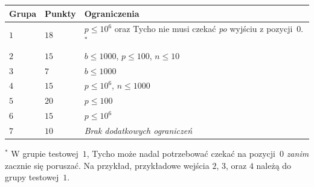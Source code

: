 \medskip
\begin{tabular}{lll}
Grupa & Punkty & Ograniczenia \\\hline
  $1$ & $18$  & $p\leq 10^6$ oraz Tycho nie musi czekać \emph{po} wyjściu z pozycji~$0$.$^*$ \\ %
  $2$ & $15$  & $b\leq 1000$, $p\leq 100$, $n\leq 10$ \\
  $3$ & $7$  & $b\leq 1000$ \\
  $4$ & $15$ & $p\leq 10^6$, $n\leq 1000$\\
  $5$ & $20$ & $p\leq 100$\\
  $6$ & $15$ & $p\leq 10^6$\\
  $7$ & $10$ & \emph{Brak dodatkowych ograniczeń}
\end{tabular}

\medskip
\noindent $^*$ W grupie testowej~$1$, Tycho może nadal potrzebować czekać na pozycji~$0$ \emph{zanim} zacznie się poruszać.
Na przykład, przykładowe wejścia $2$, $3$, oraz $4$ należą do grupy testowej~$1$.
